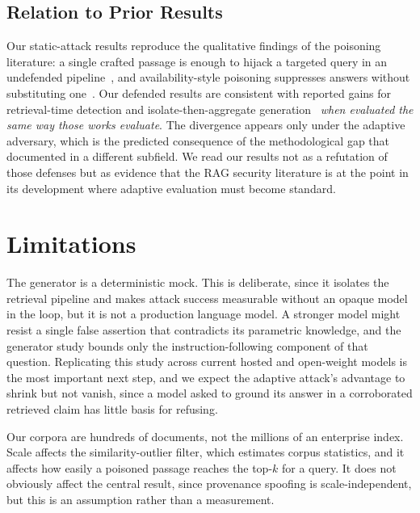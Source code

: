 \documentclass[information,article,submit,moreauthors]{Definitions/mdpi}
\begin{document}
\subsection{Relation to Prior Results}

Our static-attack results reproduce the qualitative findings of the poisoning literature: a
single crafted passage is enough to hijack a targeted query in an undefended
pipeline~\citep{zou2024,zhong2023}, and availability-style poisoning suppresses answers without
substituting one~\citep{shafran2024jamming}. Our defended results are consistent with reported
gains for retrieval-time detection and isolate-then-aggregate
generation~\citep{xiang2024robustrag,zhou2025trustrag} \emph{when evaluated the same way those
works evaluate}. The divergence appears only under the adaptive adversary, which is the
predicted consequence of the methodological gap that
\citet{carlini2017bypassing,athalye2018obfuscated,tramer2020adaptive} documented in a different
subfield. We read our results not as a refutation of those defenses but as evidence that the
RAG security literature is at the point in its development where adaptive evaluation must
become standard.

\section{Limitations}
\label{sec:limitations}

The generator is a deterministic mock. This is deliberate, since it isolates the retrieval
pipeline and makes attack success measurable without an opaque model in the loop, but it is not
a production language model. A stronger model might resist a single false assertion that
contradicts its parametric knowledge, and the generator study bounds only the
instruction-following component of that question. Replicating this study across current hosted
and open-weight models is the most important next step, and we expect the adaptive attack's
advantage to shrink but not vanish, since a model asked to ground its answer in a corroborated
retrieved claim has little basis for refusing.

Our corpora are hundreds of documents, not the millions of an enterprise index. Scale affects
the similarity-outlier filter, which estimates corpus statistics, and it affects how easily a
poisoned passage reaches the top-$k$ for a query. It does not obviously affect the central
result, since provenance spoofing is scale-independent, but this is an assumption rather than a
measurement.
\end{document}
